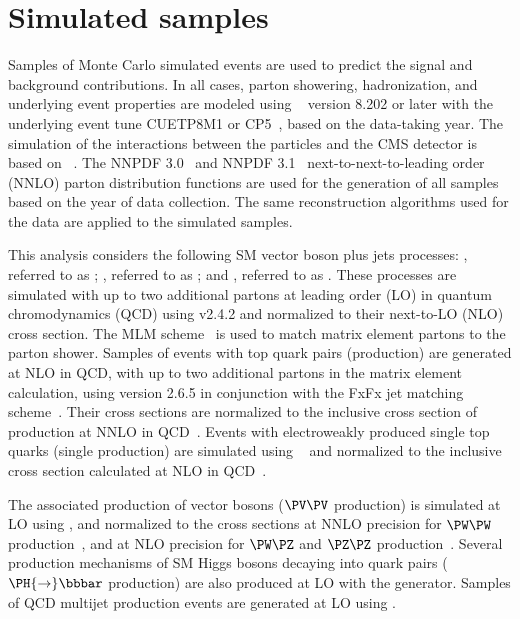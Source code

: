 \section{Simulated samples}

Samples of Monte Carlo simulated events are used to predict the signal and background contributions. In all cases, parton showering, hadronization, and underlying event properties are modeled using \PYTHIA~\cite{Sjostrand:2014zea} version 8.202 or later with the underlying event tune CUETP8M1 or CP5~\cite{CMS:2019csb}, based on the data-taking year. 
The simulation of the interactions between the particles and the CMS detector is based on \GEANTfour~\cite{Agostinelli:2002hh}. The NNPDF 3.0~\cite{Ball2015} and NNPDF 3.1~\cite{Ball:2017nwa} next-to-next-to-leading order (NNLO) parton distribution functions are used for the generation of all samples based on the year of data collection. The same reconstruction algorithms used for the data are applied to the simulated samples. 

This analysis considers the following SM vector boson plus jets processes: \Zvvjets, referred to as \Zjets; \Zlljets, referred to as \DYjets; and \Wlvjets, referred to as \Wjets. These processes are simulated with up to two additional partons at leading order (LO) in quantum chromodynamics (QCD) using \MGvATNLO \cite{MADGRAPH} v2.4.2 and normalized to their next-to-LO (NLO) cross section. The MLM scheme~\cite{Mangano:2006rw} is used to match matrix element partons to the parton shower. Samples of events with top quark pairs (\ttbar production) are generated at NLO in QCD, with up to two additional partons in the matrix element calculation, using \MGvATNLO version 2.6.5 in conjunction with the FxFx jet matching scheme~\cite{Frederix:2012ps}. Their cross sections are normalized to the inclusive cross section of \ttbar production at NNLO in QCD~\cite{Czakon:2013goa}. 
Events with electroweakly produced single top quarks (single \PQt production) are simulated using ~\cite{Nason:2004rx,Frixione:2007vw,Alioli:2010xd,Alioli:2009je,Re:2010bp} and normalized to the inclusive cross section calculated at NLO in QCD~\cite{Aliev:2010zk,Kant:2014oha}.

The associated production of vector bosons ($\PV\PV$ production) is simulated at LO using \PYTHIA, and normalized to the cross sections at NNLO precision for $\PW\PW$ production~\cite{Gehrmann:2014fva}, and at NLO precision for $\PW\PZ$ and $\PZ\PZ$ production~\cite{Campbell:1999ah}. Several production mechanisms of SM Higgs bosons decaying into \PQb quark pairs ($\PH {\to} \bbbar$ production) are also produced at LO with the \POWHEG generator. Samples of QCD multijet production events are generated at LO using \MGvATNLO.

